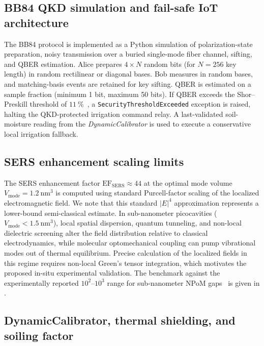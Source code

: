 \documentclass[preprint,12pt]{elsarticle}
\begin{document}
\subsection*{BB84 QKD simulation and fail-safe IoT architecture}

The BB84 protocol is implemented as a Python simulation of polarization-state preparation, noisy transmission over a buried single-mode fiber channel, sifting, and QBER estimation.
Alice prepares $4 \times N$ random bits (for $N = 256$ key length) in random rectilinear or diagonal bases.
Bob measures in random bases, and matching-basis events are retained for key sifting.
QBER is estimated on a sample fraction (minimum 1 bit, maximum 50 bits).
If QBER exceeds the Shor--Preskill threshold of $\qty{11}{\percent}$~\cite{Shor2000}, a \texttt{SecurityThresholdExceeded} exception is raised, halting the QKD-protected irrigation command relay.
A last-validated soil-moisture reading from the \textit{DynamicCalibrator} is used to execute a conservative local irrigation fallback.

\subsection*{SERS enhancement scaling limits}

The SERS enhancement factor $\mathrm{EF}_{\mathrm{SERS}} \approx 44$ at the optimal mode volume $V_{\mathrm{mode}} = \qty{1.2}{\nm\cubed}$ is computed using standard Purcell-factor scaling of the localized electromagnetic field. We note that this standard $|E|^4$ approximation represents a lower-bound semi-classical estimate. In sub-nanometer picocavities ($V_{\mathrm{mode}} < \qty{1.5}{\nm\cubed}$), local spatial dispersion, quantum tunneling, and non-local dielectric screening alter the field distribution relative to classical electrodynamics, while molecular optomechanical coupling can pump vibrational modes out of thermal equilibrium. Precise calculation of the localized fields in this regime requires non-local Green's tensor integration, which motivates the proposed in-situ experimental validation. The benchmark against the experimentally reported $10^2$--$10^3$ range for sub-nanometer NPoM gaps~\cite{Baumberg2019} is given in .

\subsection*{DynamicCalibrator, thermal shielding, and soiling factor}
\end{document}
